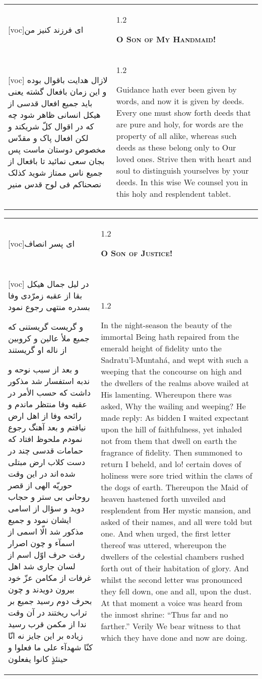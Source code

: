 \documentclass[11pt]{article}
\makeatletter
\newenvironment{orig}
  {\begin{farsi}[voc]}
  {\end{farsi}}
\newenvironment{trans}
  {\Large\begin{spacing}{1.2}\raggedright}
  {\end{spacing}}
\newenvironment{word}
  {\begin{tabular}[t]{p{2.75in}@{\hspace{3em}}p{2.75in}}}
  {\end{tabular}}
\newcommand{\ayat}[2]{\begin{orig}#1\end{orig} & \begin{trans}#2\end{trans}}
\newcommand{\heading}[2]{\textsc{\textbf{#1}} %
}
\makeatother
\begin{document}
\begin{word}
\ayat{ای فرزند کنيز من}{\heading{O Son of My Handmaid!}{}} \\ \ayat{
لازال هدايت باقوال بوده و اين زمان بافعال گشته
يعنی بايد جميع افعال قدسی از هيکل انسانی ظاهر شود چه که در اقوال کلّ شريکند و لکن افعال پاک و مقدّس مخصوص دوستان ماست
پس بجان سعی نمائيد تا بافعال از جميع ناس ممتاز شويد
کذلک نصحناکم فی لوح قدس منير
}{
  Guidance hath ever been given by words, and now it is given by deeds. Every
  one must show forth deeds that are pure and holy, for words are the property
  of all alike, whereas such deeds as these belong only to Our loved ones.
  Strive then with heart and soul to distinguish yourselves by your deeds. In
  this wise We counsel you in this holy and resplendent tablet.
}
\end{word}

\pagebreak

\begin{word}
\ayat{ای پسر انصاف}{\heading{O Son of Justice!}{}} \\ \ayat{
در ليل جمال هيکل بقا از عقبه زمرّدی وفا بسدره منتهی رجوع نمود

و گريست گريستنی که جميع ملأ عالين و کروبين از ناله او گريستند

و بعد از سبب نوحه و ندبه استفسار شد مذکور داشت که حسب الأمر در عقبه وفا منتظر ماندم و رائحه وفا از اهل ارض نيافتم و بعد آهنگ رجوع نمودم ملحوظ افتاد که حمامات قدسی چند در دست کلاب ارض مبتلی شده اند
در اين وقت حوريّه الهی از قصر روحانی بی ستر و حجاب دويد و سؤال از اسامی ايشان نمود و جميع مذکور شد الّا اسمی از اسمآء
و چون اصرار رفت حرف اوّل اسم از لسان جاری شد اهل غرفات از مکامن عزّ خود بيرون دويدند و چون بحرف دوم رسيد جميع بر تراب ريختند در آن وقت ندا از مکمن قرب رسيد زياده بر اين جايز نه انّا کنّا شهدآء علی ما فعلوا و حينئذٍ کانوا يفعلون
}{
  In the night-season the beauty of the immortal Being hath repaired from the
  emerald height of fidelity unto the Sadratu'l-Muntahá, and wept with such a
  weeping that the concourse on high and the dwellers of the realms above
  wailed at His lamenting. Whereupon there was asked, Why the wailing and
  weeping? He made reply: As bidden I waited expectant upon the hill of
  faithfulness, yet inhaled not from them that dwell on earth the fragrance of
  fidelity. Then summoned to return I beheld, and lo! certain doves of
  holiness were sore tried within the claws of the dogs of earth. Thereupon
  the Maid of heaven hastened forth unveiled and resplendent from Her mystic
  mansion, and asked of their names, and all were told but one. And when
  urged, the first letter thereof was uttered, whereupon the dwellers of the
  celestial chambers rushed forth out of their habitation of glory. And whilst
  the second letter was pronounced they fell down, one and all, upon the dust.
  At that moment a voice was heard from the inmost shrine: ``Thus far and no
  farther.'' Verily We bear witness to that which they have done and now are
  doing.
}
\end{word}
\end{document}
